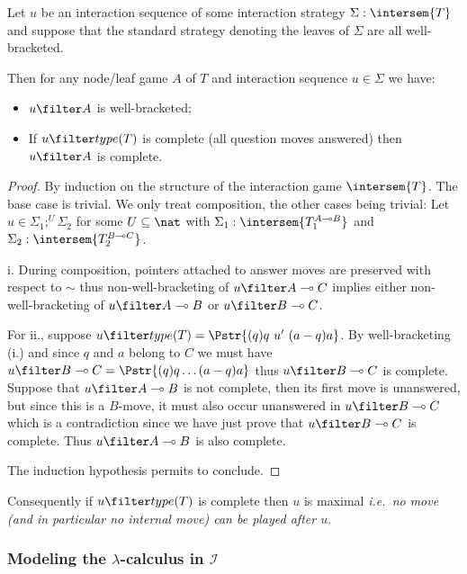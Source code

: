 \begin{lemma}
\label{lem:inter_complete}
Let $u$ be an interaction sequence of some interaction strategy $\Sigma : \intersem{T}$
and suppose that the standard strategy denoting the leaves of $\Sigma$ are all well-bracketed.

Then for any node/leaf game $A$ of $T$ and interaction sequence $u\in \Sigma$ we have:
\begin{itemize}[i.]
\item $u \filter A$ is well-bracketed;

\item If $u \filter type(T)$ is complete (all question moves answered) then
    $u \filter A$ is complete.
\end{itemize}
\end{lemma}
\begin{proof}
By induction on the structure of the interaction game $\intersem{T}$. The base case is
trivial. We only treat composition, the other cases being trivial: Let $ u \in \Sigma_1 ; ^U \Sigma_2$ for some $U \subseteq \nat$ with
$\Sigma_1 : \intersem{T_1^{A\multimap B}}$ and $\Sigma_2 : \intersem{T_2^{B\multimap C}}$.

i. During composition, pointers attached to answer moves are preserved with respect to $\sim$
thus non-well-bracketing of $u\filter A\multimap C$ implies
either non-well-bracketing of $u\filter A\multimap B$ or $u\filter B\multimap C$.

For ii., suppose $u \filter type(T) = \Pstr{(q)q\ u'\ (a-q)a }$.
By well-bracketing (i.) and since $q$ and $a$ belong to $C$ we must have
$u \filter B\multimap C = \Pstr{(q)q \ldots (a-q)a}$ thus $u \filter B\multimap C$ is complete.
Suppose that $u \filter A\multimap B$ is not complete, then its first move is unanswered,
but since this is a $B$-move, it must also occur unanswered in $u \filter B\multimap C$ which is a contradiction
since we have just prove that $u \filter B\multimap C$ is complete. Thus $u \filter A\multimap B$  is also complete.

The induction hypothesis permits to conclude.
\end{proof}
Consequently if $u\filter type(T)$ is complete then $u$ is maximal {\em i.e.~no move (and in particular no internal move) can be played after $u$}.

\subsubsection{Modeling the $\lambda$-calculus in $\mathcal{I}$}

